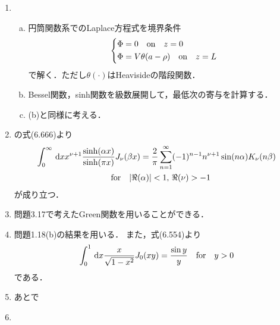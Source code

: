 \begin{enumerate}[label={\large 3.\arabic*}]
\begin{enumerate}[(a)]
    \end{enumerate}
  \item 
    \begin{enumerate}[(a)]%
      \item  円筒関数系でのLaplace方程式を境界条件
        \begin{gather}%
          \begin{dcases}%
            \Phi = 0\qqtext{on} z = 0\\
            \Phi = V\theta(a-\rho) \qqtext{on} z = L
          \end{dcases}%
        \end{gather}%
        で解く．ただし$\theta(\cdot)$はHeavisideの階段関数．
      \item Bessel関数，sinh関数を級数展開して，最低次の寄与を計算する．
      \item (b)と同様に考える．
    \end{enumerate}%
  \item 
    \cite{gradshteyn2014}の式(6.666)より
    \begin{multline}%
      \int_0^\infty \dl{x} x^{\nu +1} \frac{\sinh(\alpha x)}{\sinh(\pi x)} J_\nu(\beta x)
      = \frac{2}{\pi}\sum_{n=1}^\infty (-1)^{n-1} n^{\nu+1}\sin(n\alpha) K_\nu(n\beta)\\
      \qqtext{for} |\Re(\alpha)| < 1,\, \Re(\nu) > -1
    \end{multline}%
    が成り立つ．
  \item 問題3.17で考えたGreen関数を用いることができる．
  \item 問題1.18(b)の結果を用いる．
    また，\cite{gradshteyn2014}式(6.554)より
    \begin{gather}%
      \int_0^1  \dl{x} \frac{x}{\sqrt{1-x^2}} J_0(xy) = \frac{\sin y}{y} \qqtext{for} y > 0
    \end{gather}%
    である．
  \item あとで
  \item 
\end{enumerate}
